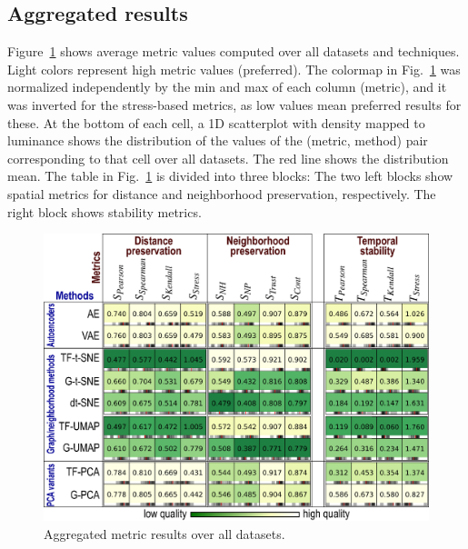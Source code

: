 \subsection{Aggregated results}
\label{sec:aggregate}
%

Figure~\ref{fig:aggregated} shows average metric values computed over all datasets and techniques.
Light colors represent high metric values (preferred). The colormap in Fig.~\ref{fig:aggregated} was normalized independently by the min and max of each column (metric), and it was inverted for the stress-based metrics, as low values mean preferred results for these. At the bottom of each cell, a 1D scatterplot with density mapped to luminance shows the distribution of the values of the (metric, method) pair corresponding to that cell over all datasets. The red line shows the distribution mean. The table in Fig.~\ref{fig:aggregated} is divided into three blocks: The two left blocks show spatial metrics for distance and neighborhood preservation, respectively. The right block shows stability metrics.

\begin{figure}[tb]\centering
  \includegraphics[width=.95\linewidth]{figures/projection-evaluation/aggregate_matrix.eps}
  \caption{Aggregated metric results over all datasets.}
  \label{fig:aggregated}
\end{figure}


